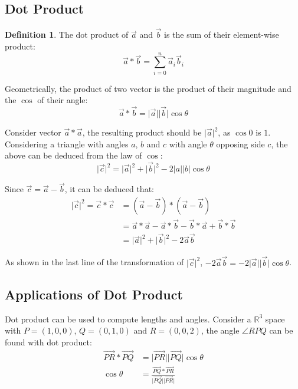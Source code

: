 \documentclass[12pt]{article}
\newcommand{\mo}[1]{\lvert #1 \rvert}
\newcommand{\mov}[1]{\lvert \vec{#1} \rvert}
\newcommand{\RR}{\mathbb{R}}
\theoremstyle{definition}
\newtheorem{defn}{Definition}[section]
\begin{document}
	\subsection{Dot Product}
	
	\begin{defn}
		The dot product of $\vec{a}$ and $\vec{b}$ is the sum of their element-wise product: $$\vec{a} * \vec{b} = \sum_{i=0}^n \vec{a}_i \vec{b}_i$$
	\end{defn}
	
	Geometrically, the product of two vector is the product of their magnitude and the $\cos$ of their angle: $$\vec{a} * \vec{b} = \mo{\vec{a}} \mo{\vec{b}} \cos \theta$$
	
	Consider vector $\vec{a} * \vec{a}$, the resulting product should be   $\mov{a}^2$, as $\cos 0$ is $1$. Considering a triangle with angles $a$, $b$ and $c$ with angle $\theta$ opposing side $c$, the above can be deduced from the law of $\cos$: $$\mov{c}^2 = \mov{a}^2 + \mov{b}^2 - 2\mo{a}\mo{b}\cos \theta$$
	
	Since $\vec{c} = \vec{a} - \vec{b}$, it can be deduced that:
	\begin{align*}
		\mov{c}^2 = \vec{c} * \vec{c} &= (\vec{a} - \vec{b})*(\vec{a} - \vec{b}) \\
		&= \vec{a} * \vec{a} - \vec{a} * \vec{b} - \vec{b} * \vec{a} + \vec{b} * \vec{b}\\
		&= \mov{a}^2 + \mov{b}^2 - 2\vec{a}\vec{b}
	\end{align*}
	
	As shown in the last line of the transformation of $\mov{c}^2$, $-2\vec{a}\vec{b} = -2\mov{a}\mov{b} \cos \theta$.
	
	\subsection{Applications of Dot Product}
	
	Dot product can be used to compute lengths and angles. Consider a $\RR^3$ space with $P = (1, 0, 0)$, $Q = (0, 1, 0)$ and $R = (0, 0, 2)$, the angle $\angle RPQ$ can be found with dot product:
	\begin{align*}
		\overrightarrow{PR} * \overrightarrow{PQ} &= \mo{\overrightarrow{PR}} \mo{\overrightarrow{PQ}} \cos \theta \\
		\cos \theta &= \frac{\overrightarrow{PQ} * \overrightarrow{PR}}{\mo{\overrightarrow{PQ}}\mo{\overrightarrow{PR}}}
	\end{align*}
	
\end{document}
